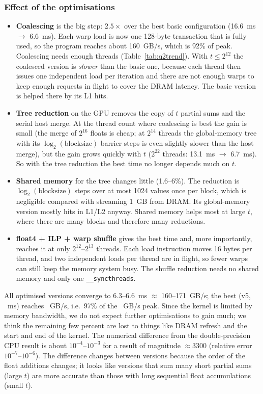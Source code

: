 \subsubsection*{Effect of the optimisations}

\begin{itemize}
\item \textbf{Coalescing} is the big step: $2.5\times$ over the best basic
  configuration (16.6~ms $\to$ 6.6~ms). Each warp load
  is now one 128-byte transaction that is fully used, so the program reaches
  about 160~GB/s, which is 92\% of peak. Coalescing needs enough threads
  (Table~\ref{tab:q2trend}). With $t\le 2^{12}$ the coalesced version is
  \emph{slower} than the basic one, because each thread then issues one independent
  load per iteration and there are not enough warps to keep enough requests in
  flight to cover the DRAM latency. The basic version is helped there by its L1 hits.
\item \textbf{Tree reduction} on the GPU removes the copy of $t$ partial sums
  and the serial host merge. At the thread count where coalescing is best the gain is
  small (the merge of $2^{16}$ floats is cheap; at $2^{14}$ threads the global-memory tree
  with its $\log_2(\text{blocksize})$ barrier steps is even slightly slower than the host merge), but the gain grows quickly
  with $t$ ($2^{22}$ threads: 13.1~ms $\to$ 6.7~ms). So with the tree reduction
  the best time no longer depends much on $t$.
\item \textbf{Shared memory} for the tree changes little (1.6--6\%). The
  reduction is $\log_2(\text{blocksize})$ steps over at most 1024 values once
  per block, which is negligible compared with streaming 1~GB from DRAM. Its
  global-memory version mostly hits in L1/L2 anyway. Shared memory helps most
  at large $t$, where there are many blocks and therefore many reductions.
\item \textbf{float4 + ILP + warp shuffle} gives the best time and,
  more importantly, reaches it at only $2^{12}$--$2^{13}$ threads. Each load
  instruction moves 16 bytes per thread, and two independent loads per thread are in
  flight, so fewer warps can still keep the memory system busy. The
  shuffle reduction needs no shared memory and only one \texttt{\_\_syncthreads}.
\end{itemize}
All optimised versions converge to 6.3--6.6~ms $\approx$ 160--171~GB/s; the best (v5,
\qtwovfivems~ms) reaches \qtwovfivegbps~GB/s, i.e.\ 97\% of the \devpeakbandwidthgbs~GB/s peak. Since
the kernel is limited by memory bandwidth, we do not expect further optimisations
to gain much; we think the remaining few percent are lost to things like DRAM
refresh and the start and end of the kernel. The numerical difference from the double-precision CPU result is about
$10^{-4}$--$10^{-3}$ for a result of magnitude $\approx 3300$ (relative error
$10^{-7}$--$10^{-6}$). The difference changes between versions because the order of
the float additions changes; it looks like versions that sum many short partial sums
(large $t$) are more accurate than those with long sequential float accumulations
(small $t$).

